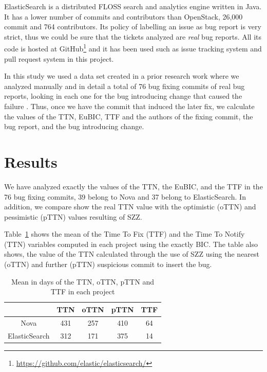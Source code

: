 \documentclass[10pt, conference]{IEEEtran}
\begin{document}
ElasticSearch is a distributed FLOSS search and analytics engine written in Java. It has a lower number of commits and contributors than OpenStack, 26,000 commit and 764 contributors. Its policy of labelling an issue as bug report is very strict, thus we could be sure that the tickets analyzed are \emph{real} bug reports. All its code is hosted at GitHub\footnote{\url{https://github.com/elastic/elasticsearch/}} and it has been used such as issue tracking system and pull request system in this project.

In this study we used a data set created in a prior research work where we analyzed manually and in detail a total of 76 bug fixing commits of real bug reports, looking in each one for the bug introducing change that caused the failure . Thus, once we have the commit that induced the later fix, we calculate the values of the TTN, EuBIC, TTF and the authors of the fixing commit, the bug report, and the bug introducing change.  


\section{Results}
\label{sec:results}

We have analyzed exactly the values of the TTN, the EuBIC, and the TTF in the 76 bug fixing commits, 39 belong to Nova and 37 belong to ElasticSearch. In addition, we compare show the real TTN value with the optimistic (oTTN) and pessimistic (pTTN) values resulting of SZZ.

Table~\ref{tableI} shows the mean of the Time To Fix (TTF) and the Time To Notify (TTN) variables computed in each project using the exactly BIC. The table also shows, the value of the TTN calculated through the use of SZZ using the nearest (oTTN) and further (pTTN) suspicious commit to insert the bug.  

\begin{table}[!t]
\renewcommand{\arraystretch}{1.3}
\label{tableI}
\centering
\caption{Mean in days of the TTN, oTTN, pTTN and TTF in each project}
\begin{tabular}{|c||c||c||c||c| }
\hline
  & TTN & oTTN & pTTN & TTF \\
\hline
Nova & 431 & 257 & 410 & 64 \\
\hline
ElasticSearch & 312 & 171 & 375 & 14\\
\hline
\end{tabular}
\end{table}
\end{document}
